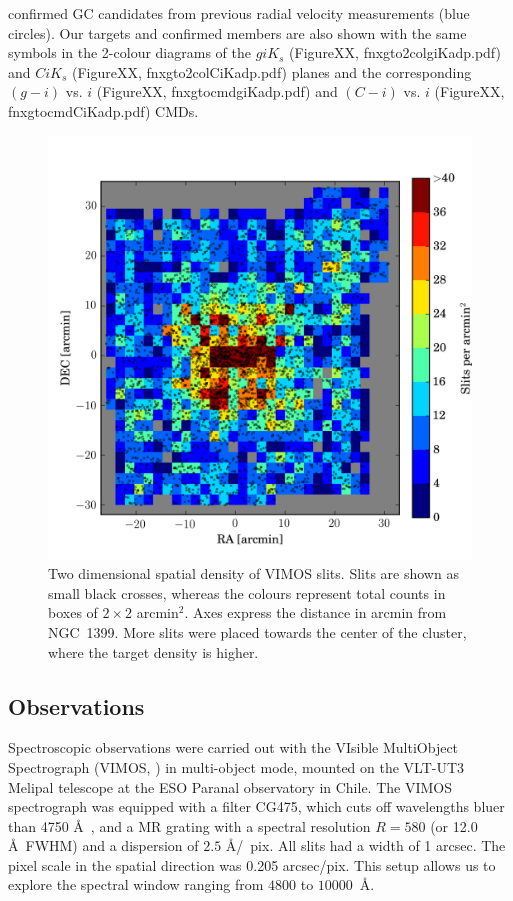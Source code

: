 confirmed GC candidates from previous  radial velocity measurements (blue 
circles). Our targets and confirmed  members are also shown with the same 
symbols in the 2-colour diagrams of the $giK_s$ (FigureXX, 
fnxgto2colgiKadp.pdf) and $CiK_s$ (FigureXX, fnxgto2colCiKadp.pdf) planes and 
the corresponding $(g-i)$ vs. $i$ (FigureXX, fnxgtocmdgiKadp.pdf) and $(C-i)$ 
vs. $i$ (FigureXX, fnxgtocmdCiKadp.pdf) CMDs.

\begin{figure}
\centering
\includegraphics[width=\columnwidth]{figures/slitdist.png} 
\caption{Two dimensional spatial density of VIMOS slits. Slits are shown as 
small black crosses, whereas the colours represent total counts in boxes of 
$2\times2$ arcmin$^2$. Axes express the distance in arcmin from NGC~1399. More 
slits were placed towards the center of the cluster, where the target density 
is higher. }
\label{fig:2dsplit}
\end{figure}

\subsection{Observations}
\label{sec:observations}

Spectroscopic observations were carried out with the VIsible MultiObject 
Spectrograph (VIMOS, \citealt{LeFevre}) in multi-object mode, mounted on the 
VLT-UT3 Melipal telescope at the ESO Paranal observatory in Chile. 
The VIMOS spectrograph was equipped with a filter CG475, which cuts off 
wavelengths bluer than 4750 \AA\ , and a MR grating with a spectral resolution 
$R = 580$ (or 12.0 \AA\ FWHM) and a dispersion of $2.5$ \AA /~pix. All slits 
had a width of 1 arcsec. The pixel scale in the spatial direction was 0.205 
arcsec/pix. This setup allows us to explore the spectral window ranging from 
$4800$ to $10000$~\AA. 

